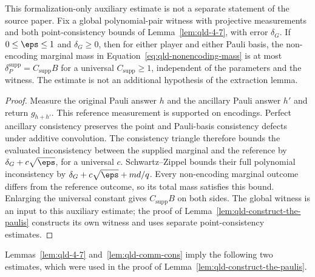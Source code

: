 \begin{lemma}
\label{lem:qld-nonencoding-mass-bound}
	\leanok
	This formalization-only auxiliary estimate is not a separate statement of
	the source paper. Fix a global polynomial-pair witness with projective
	measurements and both point-consistency bounds of Lemma~\ref{lem:qld-4-7},
	with error $\delta_G$. If $0\leq\eps\leq1$ and $\delta_G\geq0$, then for
	either player and either Pauli basis, the non-encoding marginal mass in
	Equation~\eqref{eq:qld-nonencoding-mass} is at most
	$\delta_P^{\mathrm{supp}}=C_{\mathrm{supp}}B$ for a universal
	$C_{\mathrm{supp}}\geq1$, independent of the parameters and the witness.
	The estimate is not an additional hypothesis of the extraction lemma.
\end{lemma}
\begin{proof}
	\leanok
	Measure the original Pauli answer $h$ and the ancillary Pauli answer $h'$
	and return $g_{h+h'}$. This reference measurement is supported on encodings.
	Perfect ancillary consistency preserves the point and Pauli-basis
	consistency defects under additive convolution. The consistency triangle
	therefore bounds the evaluated inconsistency between the supplied marginal
	and the reference by $\delta_G+c\sqrt\eps$, for a universal $c$.
	Schwartz--Zippel bounds their full polynomial inconsistency by
	$\delta_G+c\sqrt\eps+md/q$. Every non-encoding marginal outcome differs
	from the reference outcome, so its total mass satisfies this bound.
	Enlarging the universal constant gives $C_{\mathrm{supp}}B$ on both sides.
	The global witness is an input to this auxiliary estimate; the proof of
	Lemma~\ref{lem:qld-construct-the-paulis} constructs its own witness and
	uses separate point-consistency estimates.
\end{proof}

Lemmas~\ref{lem:qld-4-7} and~\ref{lem:qld-comm-cons} imply the following two estimates, which were used in the proof of Lemma~\ref{lem:qld-construct-the-paulis}.

